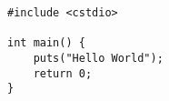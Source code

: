 \begin{lstlisting}[title=\href{https://godbolt.org/z/_xDP3i}{\texttt{godbolt.org/z/\_xDP3i}}]
#include <cstdio>

int main() {
    puts("Hello World");
    return 0;
}
\end{lstlisting}
